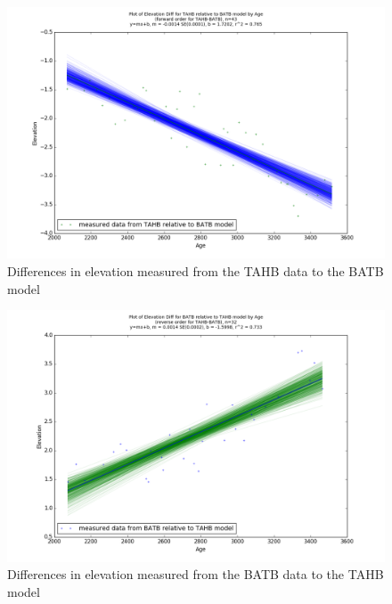 \begin{figure}[h]
	\includegraphics[width=0.9\linewidth]{data/bothNonZero/withinSeventyFivePercent/gias/theGIA_TAHB_relative_to_BATB.png}
	\caption{Differences in elevation measured from the TAHB data to the BATB model}
	\label{fig:gias_TAHBxBATB}
\end{figure}
\newpage


\begin{figure}[h]
	\includegraphics[width=0.9\linewidth]{data/bothNonZero/withinSeventyFivePercent/gias/theGIA_BATB_relative_to_TAHB.png}
	\caption{Differences in elevation measured from the BATB data to the TAHB model}
	\label{fig:gias_BATBxTAHB}
\end{figure}
\newpage








